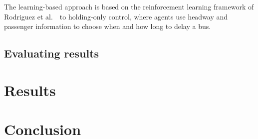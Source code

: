 \documentclass[conference]{IEEEtran}
\begin{document}
The learning-based approach is based on the reinforcement learning framework of Rodriguez et al.~\cite{rodriguez2023}\ to holding-only control, where agents use headway and passenger information to choose when and how long to delay a bus.

\subsection{Evaluating results}


\section{Results}

\section{Conclusion}



\end{document}
